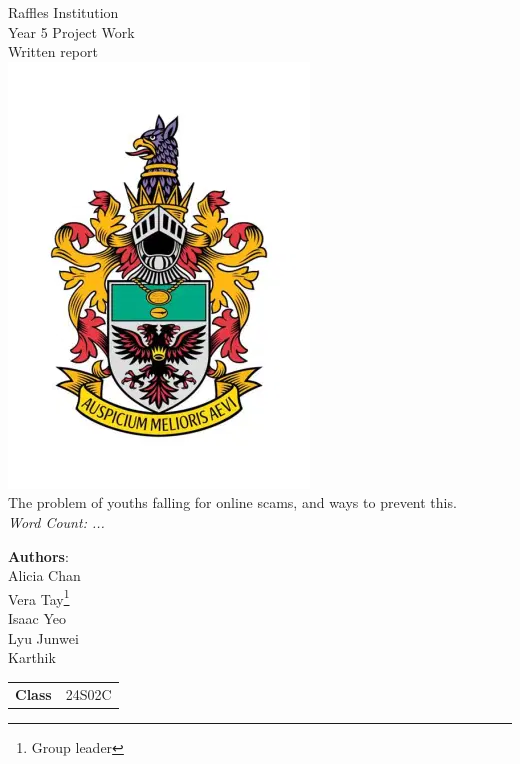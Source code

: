 \documentclass[a4paper]{article}
\begin{document}
\begin{titlepage}
	\Centering
	\Large{Raffles Institution \\ Year 5 Project Work \\ Written report} \\
	\includegraphics[scale=0.5]{ri-school-crest.png} \\
	\huge{The problem of youths falling for online scams, and ways to prevent this.} \\
	\vspace{0.5cm}
	\small{\emph{Word Count: ...}} \\
	\vspace{0.5cm}
	\large{
		\textbf{Authors}: \\
		Alicia Chan \\
		Vera Tay\footnote{Group leader} \\
		Isaac Yeo \\
		Lyu Junwei \\
		Karthik \\
		\vspace{1cm}
		\begin{tabular}{r@{:}l}
			\textbf{Class} & \hspace{1cm} 24S02C \\
		\end{tabular}

	}
\end{titlepage}

\newpage

\allsectionsfont{\raggedright}
\end{document}
